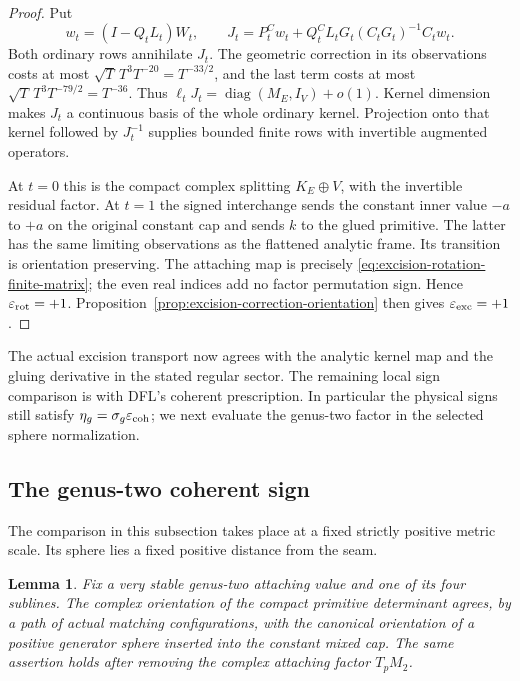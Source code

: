 \documentclass[11pt]{amsart}
\newtheorem{lemma}[theorem]{Lemma}
\theoremstyle{definition}
\theoremstyle{remark}
\theoremstyle{plain}
\begin{document}
\begin{proof}
Put
\[
 w_t=(I-Q_tL_t)W_t,\qquad
 J_t=P_t^Cw_t+
        Q_t^CL_tG_t(C_tG_t)^{-1}C_tw_t .
\]
Both ordinary rows annihilate $J_t$.
The geometric correction in its observations
costs at most $\sqrt T\,T^3T^{-20}=T^{-33/2}$,
and the last term costs at most
$\sqrt T\,T^3T^{-79/2}=T^{-36}$.
Thus $\ell_tJ_t=\operatorname{diag}(M_E,I_V)+o(1)$.
Kernel dimension makes $J_t$ a continuous
basis of the whole ordinary kernel.
Projection onto that kernel followed by
$J_t^{-1}$ supplies bounded finite rows
with invertible augmented operators.

At $t=0$ this is the compact complex
splitting $K_E\oplus V$, with the invertible
residual factor. At $t=1$ the signed
interchange sends the constant inner value
$-a$ to $+a$ on the original constant cap
and sends $k$ to the glued primitive.
The latter has the same limiting
observations as the flattened analytic
frame. Its transition is orientation
preserving. The attaching map is precisely
\eqref{eq:excision-rotation-finite-matrix};
the even real indices add no factor
permutation sign. Hence
$\varepsilon_{\rm rot}=+1$.
Proposition~\ref{prop:excision-correction-orientation}
then gives $\varepsilon_{\rm exc}=+1$.
\end{proof}

The actual excision transport now agrees with the
analytic kernel map and the gluing derivative in
the stated regular sector. The remaining local
sign comparison is with DFL's coherent prescription.
In particular the physical signs still satisfy
$\eta_g=\sigma_g\varepsilon_{\rm coh}$;
we next evaluate the genus-two factor in the selected
sphere normalization.

\subsection{The genus-two coherent sign}

The comparison in this subsection takes place at a fixed
strictly positive metric scale. Its sphere lies a fixed
positive distance from the seam.

\begin{lemma}\label{lem:compact-interior-sphere-orientation}
Fix a very stable genus-two attaching value and one of
its four sublines. The complex orientation of the compact
primitive determinant agrees, by a path of actual matching
configurations, with the canonical orientation of a positive
generator sphere inserted into the constant mixed cap.
The same assertion holds after removing the complex
attaching factor $T_pM_2$.
\end{lemma}
\end{document}
